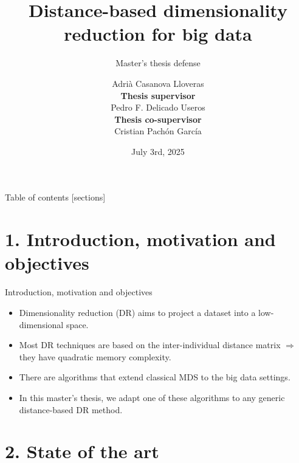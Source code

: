 \documentclass[10pt]{beamer}
\title{Distance-based dimensionality reduction for big data}
\subtitle{Master's thesis defense}
\date{July 3rd, 2025}
\author{Adrià Casanova Lloveras\\
\textbf{Thesis supervisor}\\
Pedro F. Delicado Useros\\
\textbf{Thesis co-supervisor}\\
Cristian Pachón García}
\begin{document}
\maketitle

\begin{frame}{Table of contents}
  [sections]
  \tableofcontents%
\end{frame}

\section{1. Introduction, motivation and objectives}

\begin{frame}{Introduction, motivation and objectives}
    \begin{itemize}
        \item \alert{Dimensionality reduction (DR)} aims to project a dataset into a low-dimensional space.
        \item Most DR techniques are based on the inter-individual distance matrix $\Rightarrow$ they have \alert{quadratic memory complexity}.
        \item There are algorithms that extend classical MDS to the \alert{big data} settings.
        \item In this master's thesis, we adapt one of these algorithms to any generic distance-based DR method.
    \end{itemize}

    
\end{frame}

\section{2. State of the art}
\end{document}
